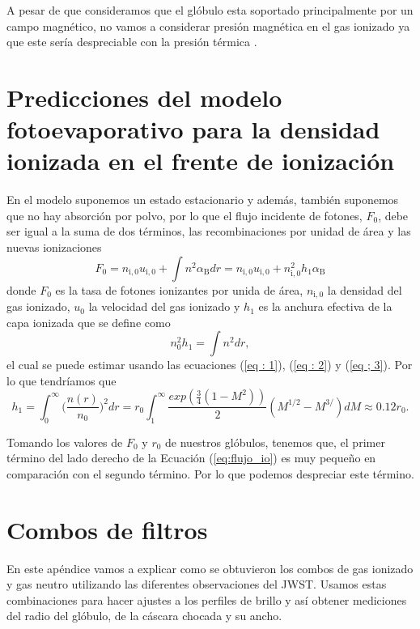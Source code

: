 \documentclass{book}
\begin{document}
A pesar de que consideramos que el glóbulo esta soportado
principalmente por un campo magnético, no vamos a considerar presión
magnética en el gas ionizado ya que este sería despreciable con la
presión térmica \citep{Will:2009}.

\chapter{Predicciones del modelo fotoevaporativo para la densidad ionizada en el frente de ionización }\label{App : tasa de fotoionizacion}

En el modelo suponemos un estado estacionario y además, también
suponemos que no hay absorción por polvo, por lo que el flujo
incidente de fotones, $F_0$, debe ser igual a la suma de dos términos,
las recombinaciones por unidad de área y las nuevas ionizaciones
\begin{equation}\label{eq:flujo_io}
F_0 = n_\mathrm{i,0} u_\mathrm{i,0} +\int n^2\alpha_\mathrm{B}dr = n_\mathrm{i,0}u_\mathrm{i,0}+n_\mathrm{i,0}^2h_1\alpha_\mathrm{B}
\end{equation}
donde $F_0$ es la tasa de fotones ionizantes por unida de área,
$n_\mathrm{i,0}$ la densidad del gas ionizado, $u_0$ la velocidad del
gas ionizado y $h_1$ es la anchura efectiva de la capa ionizada que se
define como
\begin{equation}
n_0^2h_1=\int n^2dr,
\end{equation}
el cual se puede estimar usando las ecuaciones (\ref{eq : 1}),
(\ref{eq : 2}) y (\ref{eq ; 3}). Por lo que tendríamos que
\begin{equation}
h_1=\int_0^\infty \Big(\frac{n(r)}{n_0}\Big)^2dr=r_0\int_1^\infty\frac{exp(\frac{3}{4}(1-M^2))}{2}(M^{1/2}-M^{3/})dM\approx0.12r_0.\end{equation}

Tomando los valores de $F_0$ y $r_0$ de nuestros glóbulos, tenemos
que, el primer término del lado derecho de la Ecuación
(\ref{eq:flujo_io}) es muy pequeño en comparación con el segundo
término. Por lo que podemos despreciar este término.

\chapter{Combos de filtros}\label{AP: combos}

En este apéndice vamos a explicar como se obtuvieron los combos de gas
ionizado y gas neutro utilizando las diferentes observaciones del
JWST. Usamos estas combinaciones para hacer ajustes a los perfiles de
brillo y así obtener mediciones del radio del glóbulo, de la cáscara
chocada y su ancho.
\end{document}
